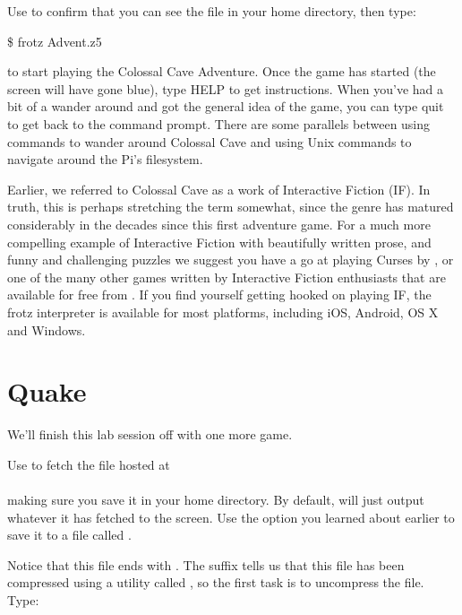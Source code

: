 Use  to confirm that you can see the file  in your home directory, then type:

\begin{ttoutenv}
\$ frotz Advent.z5
\end{ttoutenv}

\noindent to start playing the Colossal Cave Adventure. Once the game has started (the screen will have gone blue), type HELP to get instructions. When you've had a bit of a wander around and got the general idea of the game, you can type quit to get back to the command prompt. There are some parallels between using commands to wander around Colossal Cave and using Unix commands to navigate around the Pi's filesystem.

Earlier, we referred to Colossal Cave as a work of Interactive Fiction (IF). In truth, this is perhaps stretching the term somewhat, since the genre has matured considerably in the decades since this first adventure game. For a much more compelling example of Interactive Fiction with beautifully written prose, and funny and challenging puzzles we suggest you have a go at playing Curses by , or one of the many other games written by Interactive Fiction enthusiasts that are available for free from . If you find yourself getting hooked on playing IF, the frotz interpreter is available for most platforms, including iOS, Android, OS X and Windows.

\section{Quake}

We'll finish this lab session off with one more game.

Use  to fetch the file hosted at
\\
\\
making sure you save it in your home directory. By default,  will just output whatever it has fetched to the screen. Use the option you learned about earlier to save it to a file called .

Notice that this file ends with . The  suffix tells us that this file has been compressed using a utility called , so the first task is to uncompress the file. Type:

